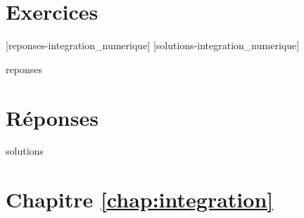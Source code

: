 \section{Exercices}
\label{sec:integration:exercices}


[reponses-integration_numerique]
[solutions-integration_numerique]

\begin{Filesave}{reponses}
\bigskip
\section*{Réponses}

\end{Filesave}

\begin{Filesave}{solutions}
\section*{Chapitre \ref*{chap:integration}}

\end{Filesave}


